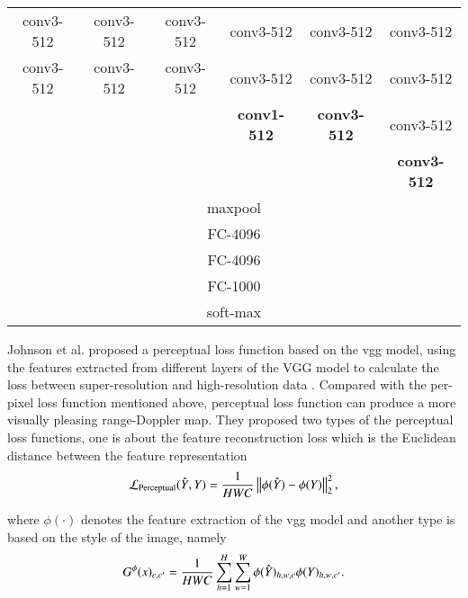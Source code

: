\begin{table}[t]
{\begin{tabular}{|c|c|c|c|c|c|}
        \hline
        conv3-512 & conv3-512 & conv3-512 & conv3-512 & conv3-512 & conv3-512 \\ 
        conv3-512 & conv3-512 & conv3-512 & conv3-512 & conv3-512 & conv3-512 \\
          &   &   & \textbf{conv1-512} & \textbf{conv3-512} & conv3-512 \\
          &   &   &   &   & \textbf{conv3-512} \\
        \hline
        \multicolumn{6}{|c|}{maxpool} \\ 
        \hline
        \multicolumn{6}{|c|}{FC-4096} \\  
        \hline
        \multicolumn{6}{|c|}{FC-4096} \\ 
        \hline
        \multicolumn{6}{|c|}{FC-1000} \\ 
        \hline
        \multicolumn{6}{|c|}{soft-max} \\ 
        \hline
    \end{tabular}
    }
\end{table}

Johnson et al. proposed a perceptual loss function based on the \gls{vgg} model, using the features extracted from different layers of the VGG model to calculate the loss between super-resolution and high-resolution data \cite{johnson_perceptual_2016}. Compared with the per-pixel loss function mentioned above, perceptual loss function can produce a more visually pleasing range-Doppler map. They proposed two types of the perceptual loss functions, one is about the feature reconstruction loss which is the Euclidean distance between the feature representation
\begin{equation}
    \centering
    \mathcal{L}_{\text{Perceptual}} (\hat{Y}, Y) = \frac{1}{H W C} \left\| \phi (\hat{Y}) - \phi (Y) \right\|_2^2,
\end{equation}

where $\phi(\cdot)$ denotes the feature extraction of the \gls{vgg} model and another type is based on the style of the image, namely
\begin{equation}
    \centering
    G^{\phi}(x)_{c, c'} = \frac{1}{H W C} \sum_{h=1}^{H} \sum_{w=1}^{W} \phi (\hat{Y})_{h,w,c} \phi (Y)_{h,w,c'}.
\end{equation}


